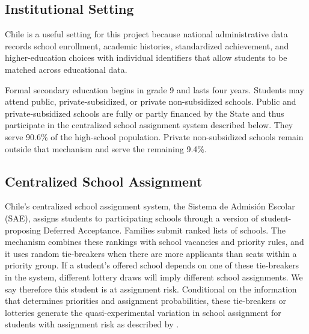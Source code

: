\documentclass[a4paper, article, english, oneside, unknownkeysallowed, 12pt]{memoir}
\begin{document}
\subsection{Institutional Setting}

Chile is a useful setting for this project because national administrative data records school enrollment, academic histories, standardized achievement, and higher-education choices with individual identifiers that allow students to be matched across educational data.

Formal secondary education begins in grade 9 and lasts four years.
Students may attend public, private-subsidized, or private non-subsidized schools.
Public and private-subsidized schools are fully or partly financed by the State and thus participate in the centralized school assignment system described below.
They serve 90.6\% of the high-school population. Private non-subsidized schools remain outside that mechanism and serve the remaining 9.4\%.



\subsection{Centralized School Assignment}

Chile's centralized school assignment system, the Sistema de Admisi\'on Escolar (SAE), assigns students to participating schools through a version of student-proposing Deferred Acceptance.
Families submit ranked lists of schools.
The mechanism combines these rankings with school vacancies and priority rules, and it uses random tie-breakers when there are more applicants than seats within a priority group.
If a student's offered school depends on one of these tie-breakers in the system, different lottery draws will imply different school assignments.
We say therefore this student is at assignment risk.  Conditional on the information that determines priorities and assignment probabilities, these tie-breakers or lotteries generate the quasi-experimental variation in school assignment for students with assignment risk as described by \textcite{abdulkadiroglu_research_2017}.
\end{document}
